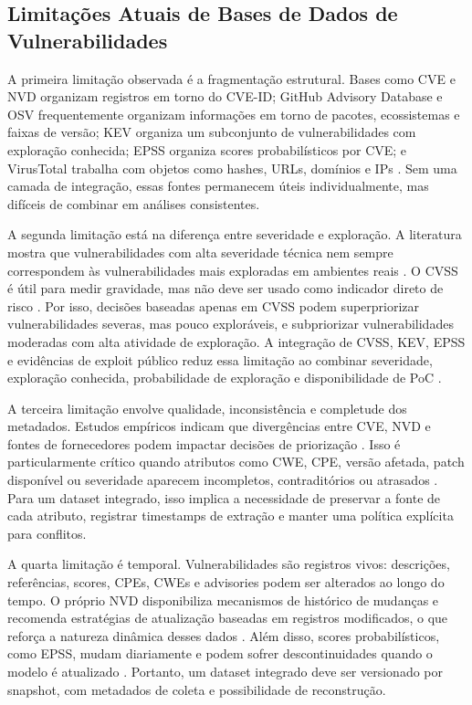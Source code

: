 \subsection{Limitações Atuais de Bases de Dados de Vulnerabilidades}

A primeira limitação observada é a fragmentação estrutural. Bases como CVE e NVD organizam registros em torno do CVE-ID; GitHub Advisory Database e OSV frequentemente organizam informações em torno de pacotes, ecossistemas e faixas de versão; KEV organiza um subconjunto de vulnerabilidades com exploração conhecida; EPSS organiza scores probabilísticos por CVE; e VirusTotal trabalha com objetos como hashes, URLs, domínios e IPs \cite{cve_program_overview,nvd_home,github_advisory_database_docs,osv_database,osv_schema,cisa_kev_catalog,first_epss,virustotal_api_v3}. Sem uma camada de integração, essas fontes permanecem úteis individualmente, mas difíceis de combinar em análises consistentes.

A segunda limitação está na diferença entre severidade e exploração. A literatura mostra que vulnerabilidades com alta severidade técnica nem sempre correspondem às vulnerabilidades mais exploradas em ambientes reais \cite{allodi_massacci_2014_cvss_exploits}. O CVSS é útil para medir gravidade, mas não deve ser usado como indicador direto de risco \cite{nvd_cvss_metrics,first_cvss}. Por isso, decisões baseadas apenas em CVSS podem superpriorizar vulnerabilidades severas, mas pouco exploráveis, e subpriorizar vulnerabilidades moderadas com alta atividade de exploração. A integração de CVSS, KEV, EPSS e evidências de exploit público reduz essa limitação ao combinar severidade, exploração conhecida, probabilidade de exploração e disponibilidade de PoC \cite{allodi_massacci_2014_cvss_exploits,cisa_kev_catalog,first_epss,exploitdb}.

A terceira limitação envolve qualidade, inconsistência e completude dos metadados. Estudos empíricos indicam que divergências entre CVE, NVD e fontes de fornecedores podem impactar decisões de priorização \cite{jiang_2021_data_inconsistency}. Isso é particularmente crítico quando atributos como CWE, CPE, versão afetada, patch disponível ou severidade aparecem incompletos, contraditórios ou atrasados \cite{nguyen_massacci_2013_nvd_versions,jiang_2021_data_inconsistency}. Para um dataset integrado, isso implica a necessidade de preservar a fonte de cada atributo, registrar timestamps de extração e manter uma política explícita para conflitos.

A quarta limitação é temporal. Vulnerabilidades são registros vivos: descrições, referências, scores, CPEs, CWEs e advisories podem ser alterados ao longo do tempo. O próprio NVD disponibiliza mecanismos de histórico de mudanças e recomenda estratégias de atualização baseadas em registros modificados, o que reforça a natureza dinâmica desses dados \cite{nvd_vulnerability_apis,nvd_data_feeds}. Além disso, scores probabilísticos, como EPSS, mudam diariamente e podem sofrer descontinuidades quando o modelo é atualizado \cite{first_epss_data_stats}. Portanto, um dataset integrado deve ser versionado por snapshot, com metadados de coleta e possibilidade de reconstrução.

